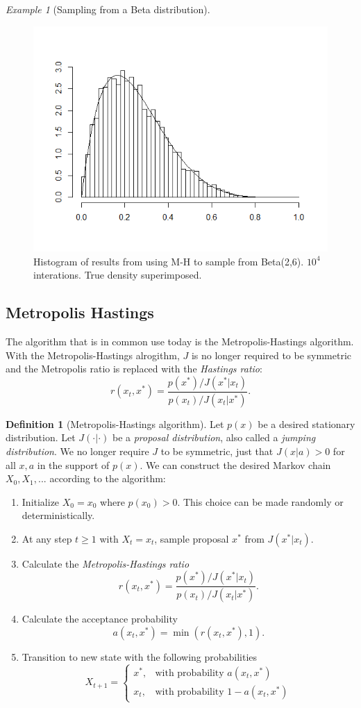 \documentclass[11pt]{amsart}
\theoremstyle{theorem} %
\theoremstyle{definition}                  %
\newtheorem{defn}[thm]{Definition}
\theoremstyle{example}                       %
\theoremstyle{remark}                       %
\newtheorem{exmp}[thm]{Example}  %
\numberwithin{equation}{section}
\begin{document}
\begin{exmp}[Sampling from a Beta distribution]
\begin{figure}
  
  \centering
    \includegraphics[width=.65\textwidth]{NEWbetahm.png}
    \caption{Histogram of results from using M-H to sample from Beta(2,6). $10^4$ interations. True density superimposed.}
    \label{fig:betamh}
\end{figure}
    
    
\end{exmp}

\subsection{Metropolis Hastings}
The algorithm that is in common use today is the Metropolis-Hastings algorithm\cite[p.~279]{gelman}. With the Metropolis-Hastings alrogithm, $J$ is no longer required to be symmetric and the Metropolis ratio is replaced with the \emph{Hastings ratio}:
\[r(x_t,x^*) =
\frac{p(x^*)/J(x^*|x_t)}
{p(x_t)/J(x_t |x^*)}.\]

\begin{defn}[{Metropolis-Hastings algorithm}]
    Let $p(x)$ be a desired stationary distribution. Let $J(\cdot|\cdot)$ be a \emph{proposal distribution}, also called a \emph{jumping distribution}. We no longer require $J$ to be symmetric, just that $J(x|a)>0$ for all $x,a$ in the support of $p(x)$. We can construct the desired Markov chain $X_0, X_1,...$ according to the algorithm:


\begin{enumerate}
    \item Initialize $X_0=x_0$ where $p(x_0)>0$. This choice can be made randomly or deterministically. 
    \item At any step $t\geq 1$ with $X_t=x_t$, sample proposal $x^*$ from $J(x^*|x_t)$.
    \item Calculate the \emph{Metropolis-Hastings ratio}
    \[r(x_t,x^*) =
\frac{p(x^*)/J(x^*|x_t)}
{p(x_t)/J(x_t |x^*)}.\]
    \item Calculate the acceptance probability
    \[a(x_t,x^*)=\min(r(x_t,x^*),1).\]
    \item Transition to new state with the following probabilities \[X_{t+1}=\begin{cases}x^*, & \text{with probability }a(x_t,x^*) \\
    x_t, & \text{with probability }1-a(x_t,x^*)
    \end{cases}\]
\end{enumerate}
\end{defn}
\end{document}

